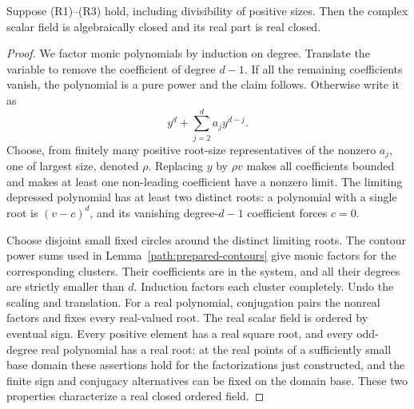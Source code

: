 \begin{lemma}\label{path:roots}
Suppose \textup{(R1)--(R3)} hold, including divisibility of positive
sizes.  Then the complex scalar field is algebraically closed and its
real part is real closed.
\end{lemma}
\begin{proof}
We factor monic polynomials by induction on degree.  Translate the
variable to remove the coefficient of degree \(d-1\).  If all the
remaining coefficients vanish, the polynomial is a pure power and the
claim follows.  Otherwise write it as
\[
 y^d+\sum_{j=2}^d a_jy^{d-j}.
\]
Choose, from finitely many positive root-size representatives of the
nonzero \(a_j\), one of largest size, denoted \(\rho\).  Replacing
\(y\) by \(\rho v\) makes all coefficients bounded and makes at
least one non-leading coefficient have a nonzero limit.  The limiting
depressed polynomial has at least two distinct roots: a polynomial
with a single root is \((v-c)^d\), and its vanishing degree-\(d-1\)
coefficient forces \(c=0\).

Choose disjoint small fixed circles around the distinct limiting roots.
The contour power sums used in Lemma~\ref{path:prepared-contours}
give monic factors for the corresponding clusters.  Their coefficients
are in the system, and all their degrees are strictly smaller than
\(d\).  Induction factors each cluster completely.  Undo the scaling
and translation.  For a real polynomial, conjugation pairs the
nonreal factors and fixes every real-valued root.  The real scalar
field is ordered by eventual sign.  Every positive element has a real
square root, and every odd-degree real polynomial has a real root:
at the real points of a sufficiently small base domain these assertions
hold for the factorizations just constructed, and the finite sign and
conjugacy alternatives can be fixed on the domain base.  These two
properties characterize a real closed ordered field.
\end{proof}

